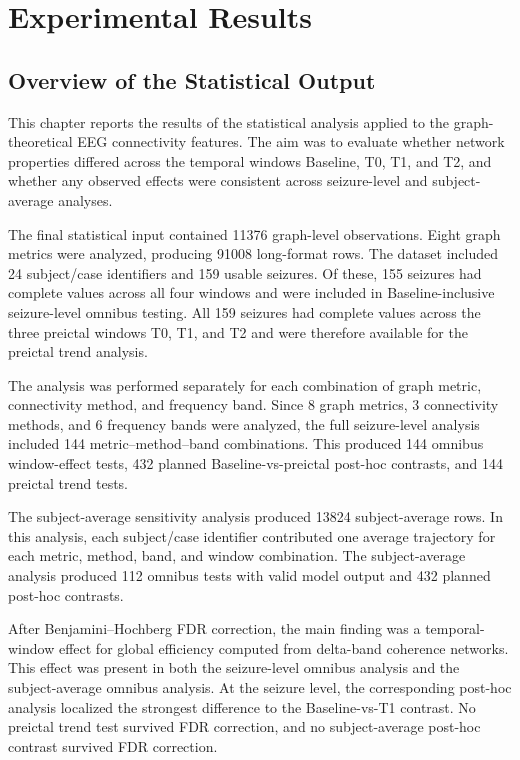 \chapter{Experimental Results}
\label{chap:experimental-results}

\section{Overview of the Statistical Output}
\label{sec:results-statistical-output-overview}

This chapter reports the results of the statistical analysis applied to the
graph-theoretical EEG connectivity features. The aim was to evaluate whether
network properties differed across the temporal windows Baseline, T0, T1, and
T2, and whether any observed effects were consistent across seizure-level and
subject-average analyses.

The final statistical input contained \num{11376} graph-level observations.
Eight graph metrics were analyzed, producing \num{91008} long-format rows. The
dataset included \num{24} subject/case identifiers and \num{159} usable
seizures. Of these, \num{155} seizures had complete values across all four
windows and were included in Baseline-inclusive seizure-level omnibus testing.
All \num{159} seizures had complete values across the three preictal windows
T0, T1, and T2 and were therefore available for the preictal trend analysis.

The analysis was performed separately for each combination of graph metric,
connectivity method, and frequency band. Since \num{8} graph metrics,
\num{3} connectivity methods, and \num{6} frequency bands were analyzed, the
full seizure-level analysis included \num{144} metric--method--band
combinations. This produced \num{144} omnibus window-effect tests, \num{432}
planned Baseline-vs-preictal post-hoc contrasts, and \num{144} preictal trend
tests.

The subject-average sensitivity analysis produced \num{13824} subject-average
rows. In this analysis, each subject/case identifier contributed one average
trajectory for each metric, method, band, and window combination. The
subject-average analysis produced \num{112} omnibus tests with valid model
output and \num{432} planned post-hoc contrasts.

After Benjamini--Hochberg FDR correction, the main finding was a temporal-window
effect for global efficiency computed from delta-band coherence networks. This
effect was present in both the seizure-level omnibus analysis and the
subject-average omnibus analysis. At the seizure level, the corresponding
post-hoc analysis localized the strongest difference to the Baseline-vs-T1
contrast. No preictal trend test survived FDR correction, and no
subject-average post-hoc contrast survived FDR correction.

